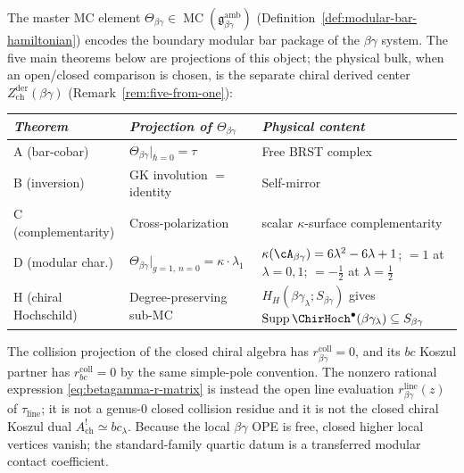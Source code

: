 \begin{remark}
\label{rem:betagamma-five-identifications}
The master MC element
$\Theta_{\beta\gamma} \in
\operatorname{MC}(\mathfrak{g}^{\mathrm{amb}}_{\beta\gamma})$
(Definition~\ref{def:modular-bar-hamiltonian}) encodes the boundary
modular bar package of the $\beta\gamma$ system. The five main
theorems below are projections of this object; the physical bulk, when
an open/closed comparison is chosen, is the separate chiral derived
center
$Z^{\mathrm{der}}_{\mathrm{ch}}(\beta\gamma)$
(Remark~\ref{rem:five-from-one}):
\begin{center}
\small
\renewcommand{\arraystretch}{1.3}
\begin{tabular}{lll}
\toprule
\emph{Theorem} & \emph{Projection of $\Theta_{\beta\gamma}$}
 & \emph{Physical content} \\
\midrule
A (bar-cobar) &
 $\Theta_{\beta\gamma}\big|_{\hbar=0} = \tau$ &
 Free BRST complex \cite{CDG20} \\
B (inversion) &
 GK involution $=$ identity &
 Self-mirror \\
C (complementarity) &
 Cross-polarization &
 scalar $\kappa$-surface complementarity \\
D (modular char.) &
 $\Theta_{\beta\gamma}\big|_{g=1,\,n=0}
 = \kappa \cdot \lambda_1$ &
 $\kappa(\cA_{\beta\gamma}) = 6\lambda^2 - 6\lambda + 1$;\; $=1$ at $\lambda = 0,1$;\; $= -\tfrac{1}{2}$ at $\lambda = \tfrac{1}{2}$ \\
H (chiral Hochschild) &
 Degree-preserving sub-MC &
 $H_H(\beta\gamma_\lambda;S_{\beta\gamma})$ gives
 $\operatorname{Supp}\ChirHoch^\bullet(\beta\gamma_\lambda)
 \subseteq S_{\beta\gamma}$ \\
\bottomrule
\end{tabular}
\end{center}
The collision projection of the closed chiral algebra has
$r^{\mathrm{coll}}_{\beta\gamma}=0$, and its $bc$ Koszul partner has
$r^{\mathrm{coll}}_{bc}=0$ by the same simple-pole convention. The
nonzero rational expression \eqref{eq:betagamma-r-matrix} is instead
the open line evaluation $r^{\mathrm{line}}_{\beta\gamma}(z)$ of
$\tau_{\mathrm{line}}$; it is not a genus-$0$ closed collision
residue and it is not the closed chiral Koszul dual
$A^!_{\mathrm{ch}}\simeq bc_\lambda$. Because the local
$\beta\gamma$ OPE is free, closed higher local vertices vanish; the
standard-family quartic datum is a transferred modular contact
coefficient.
\end{remark}

